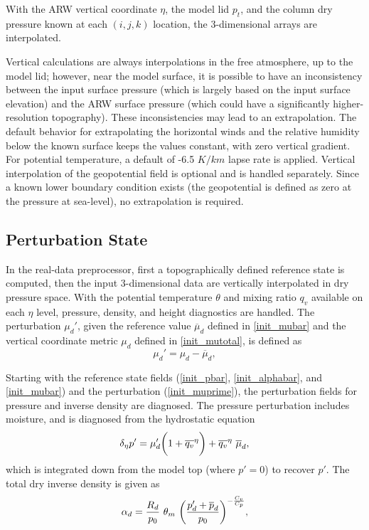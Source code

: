 \noindent
With the ARW vertical coordinate $\eta$, the model lid $p_{t}$, and the column dry
pressure known at each $(i,j,k)$ location, the 3-dimensional arrays are interpolated.

Vertical calculations are always interpolations in the free atmosphere, up to the model lid;
however, near the model surface, it is possible to have an inconsistency between the input
surface pressure (which is largely based on the input surface elevation) and the ARW surface
pressure (which could have a significantly higher-resolution topography).  These inconsistencies
may lead to an extrapolation.  The default behavior for extrapolating the horizontal winds and
the relative humidity below the known surface keeps the values constant, with zero vertical gradient.
For potential temperature, a default of -6.5 $K/km$ lapse rate is applied.
Vertical interpolation of the geopotential field is optional and is
handled separately.  Since a known lower boundary condition exists  
(the geopotential is defined as zero at the pressure at sea-level), no extrapolation is required.



\subsection{Perturbation State}

In the real-data preprocessor, first a topographically defined reference state is computed, 
then the input 3-dimensional data are vertically
interpolated in dry pressure space. With the potential temperature $\theta$ and mixing ratio
$q_v$ available on each $\eta$ level, pressure, density, and height diagnostics are
handled.
\noindent  The perturbation $\mu_d'$,
given the reference value $\overline{\mu}_d$ defined in \eqref{init_mubar} 
and the vertical coordinate metric $\mu_d$ defined in \eqref{init_mutotal},
is defined as
\begin{equation}
\mu_d'  = \mu_d - \overline{\mu}_d,
\label{init_muprime}
\end{equation}

\noindent Starting with the reference state fields 
(\ref{init_pbar}, \ref{init_alphabar}, and \ref{init_mubar}) and the perturbation (\ref{init_muprime}),
the perturbation fields for pressure and inverse density are diagnosed.
The pressure perturbation includes moisture, and is diagnosed from 
the hydrostatic equation
%
\begin{equation}
\delta_{\eta} p' = \mu'_d \bigg(1 + {\overline{q_v}^\eta} \bigg) + 
                     \overline{q_v}^\eta~\overline \mu_d,
\notag
\end{equation}
%
\noindent 
which is
integrated down from 
the model top (where $p'= 0$) to recover $p'$.
The total dry inverse density is given as
\begin{equation}
\alpha_d = {R_d \over p_{0} } ~ \theta_m~ 
                                        \bigg( {{p'_d + \overline {p}_d} \over p_{0} } \bigg )^{-{C_v \over C_p}},
\notag
\end{equation}

